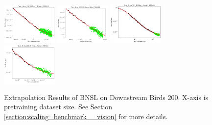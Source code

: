 \documentclass{article} %
\begin{document}
\begin{figure}[!htb]
\includegraphics[width=0.245\textwidth]{figures/scaling_laws_benchmark_dataset_plots/birds_25___MiX_B_16.png}
\includegraphics[width=0.245\textwidth]{figures/scaling_laws_benchmark_dataset_plots/birds_25___MiX_L_16.png}
\includegraphics[width=0.245\textwidth]{figures/scaling_laws_benchmark_dataset_plots/birds_25___ViT_B_16.png}
\includegraphics[width=0.245\textwidth]{figures/scaling_laws_benchmark_dataset_plots/birds_25___ViT_S_16.png}
\caption{
    Extrapolation Results of BNSL on Downstream Birds 200. X-axis is pretraining dataset size. See Section \ref{section:scaling_benchmark__vision} for more details.
    }
    \label{fig:scaling_laws_benchmark_dataset__birds}
\end{figure}
\end{document}
